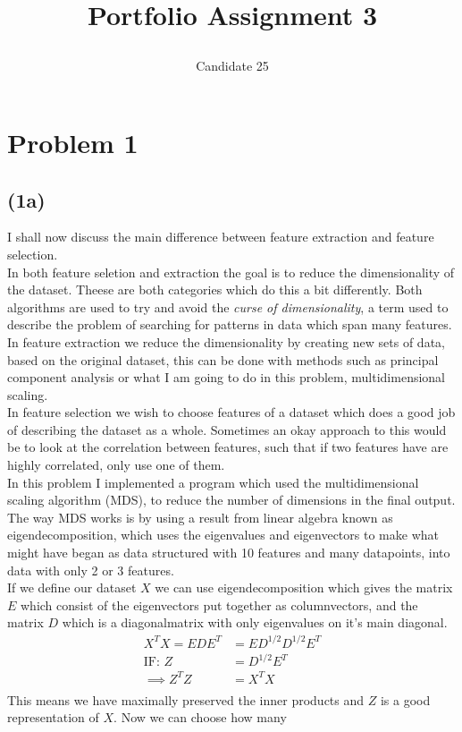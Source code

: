 \documentclass[12pt, letterpaper]{article}
\title{ \begin{huge}
\textbf{Portfolio Assignment 3}
\end{huge} }
\author{Candidate 25}
\date{}
\begin{document}
\maketitle
  \section*{Problem 1}
    \subsection*{(1a)}
      I shall now discuss the main difference between feature extraction and feature selection.\\

      In both feature seletion and extraction the goal is to reduce the dimensionality of the dataset. Theese are both categories which do this a bit differently. Both algorithms are used to try and avoid the \textit{curse of dimensionality}, a term used to describe the problem of searching for patterns in data which span many features.\\
      In feature extraction we reduce the dimensionality by creating new sets of data, based on the original dataset, this can be done with methods such as principal component analysis or what I am going to do in this problem, multidimensional scaling.\\
      In feature selection we wish to choose features of a dataset which does a good job of describing the dataset as a whole. Sometimes an okay approach to this would be to look at the correlation between features, such that if two features have are highly correlated, only use one of them.\\

      In this problem I implemented a program which used the multidimensional scaling algorithm (MDS), to reduce the number of dimensions in the final output. The way MDS works is by using a result from linear algebra known as eigendecomposition, which uses the eigenvalues and eigenvectors to make what might have began as data structured with 10 features and many datapoints, into data with only 2 or 3 features.\\
      If we define our dataset $X$ we can use eigendecomposition which gives the matrix $E$ which consist of the eigenvectors put together as columnvectors, and the matrix $D$ which is a diagonalmatrix with only eigenvalues on it's main diagonal.
      \begin{align*}
        X^T X = EDE^T &= ED^{1/2}D^{1/2}E^T\\
        \text{IF: } Z &= D^{1/2}E^T\\
        \implies Z^T Z &= X^T X\\
      \end{align*}
      This means we have maximally preserved the inner products and $Z$ is a good representation of $X$. Now we can choose how many
\end{document}
